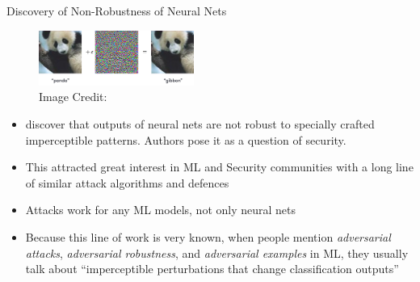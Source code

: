 \documentclass[10pt]{beamer}
\begin{document}
\begin{frame}[fragile]{Discovery of Non-Robustness of Neural Nets}

  \begin{figure}
    \includegraphics[width=2in]{panda.png} \\
    \footnotesize Image Credit: \cite{GoodfellowSS14}
  \end{figure}

  \begin{itemize}[<+->]
    \item \citet{SzegedyZSBEGF13} discover that outputs of neural nets are not robust to
      specially crafted imperceptible patterns. Authors pose it as a question of security.
    \item This attracted great interest in ML and Security communities with a long line of
      similar attack algorithms and defences
    \item Attacks work for any ML models, not only neural nets
    \item Because this line of work is very known, when people mention \emph{adversarial
      attacks}, \emph{adversarial robustness}, and \emph{adversarial examples} in ML, they usually
      talk about ``imperceptible perturbations that change classification outputs''
  \end{itemize}
\end{frame}
\end{document}
